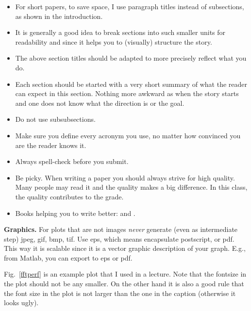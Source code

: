 \documentclass[letterpaper]{article}
\newcommand{\mypar}[1]{{\bf #1.}}
\begin{document}
\begin{itemize}
\item For short papers, to save space, I use paragraph titles instead of
subsections, as shown in the introduction.

\item It is generally a good idea to break sections into such smaller
units for readability and since it helps you to (visually) structure the story.

\item The above section titles should be adapted to more precisely
reflect what you do.

\item Each section should be started with a very
short summary of what the reader can expect in this section. Nothing
more awkward as when the story starts and one does not know what the
direction is or the goal.

\item Do not use subsubsections.

\item Make sure you define every acronym you use, no matter how
convinced you are the reader knows it.

\item Always spell-check before you submit.

\item Be picky. When writing a paper you should always strive for 
high quality. Many people may read it and the quality makes a big difference.
In this class, the quality contributes to the grade.

\item Books helping you to write better: \cite{Higham:98} and \cite{Strunk:00}.
\end{itemize}

\mypar{Graphics} For plots that are not images {\em never} generate (even as intermediate step)
jpeg, gif, bmp, tif. Use eps, which means encapsulate postscript, or pdf. This way it is
scalable since it is a vector graphic description of your graph. E.g.,
from Matlab, you can export to eps or pdf.

Fig.~\ref{fftperf} is an example plot that I used in a lecture. Note that the fontsize in the plot should not be any smaller. On the other hand it is also a good rule that the font size in the plot is not larger than the one in the caption (otherwise it looks ugly).
\end{document}
